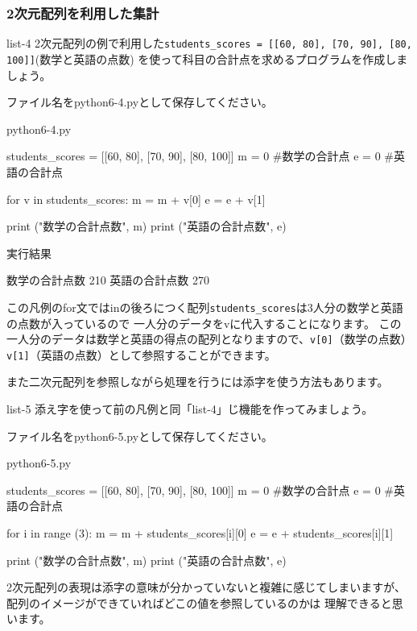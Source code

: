 \documentclass[11pt,a4paper,dvipdfmx,titlepage]{jsreport}
\begin{document}
\subsubsection{2次元配列を利用した集計}
\begin{pabox}{list-4}
2次元配列の例で利用した{\tt students\_scores = [[60, 80], [70, 90], [80, 100]]}(数学と英語の点数)
を使って科目の合計点を求めるプログラムを作成しましょう。

ファイル名をpython6-4.pyとして保存してください。
\begin{legbox}{python6-4.py}
\begin{listing}{1}
students_scores = [[60, 80], [70, 90], [80, 100]]
m = 0 #数学の合計点
e = 0 #英語の合計点

for v in students_scores:
    m = m + v[0]
    e = e + v[1]

print ("数学の合計点数", m)
print ("英語の合計点数", e)
\end{listing}
実行結果
\begin{listing}{1}
数学の合計点数 210
英語の合計点数 270
\end{listing}
\end{legbox}
この凡例のfor文ではinの後ろにつく配列{\tt students\_scores}は3人分の数学と英語の点数が入っているので
一人分のデータをvに代入することになります。
この一人分のデータは数学と英語の得点の配列となりますので、{\tt v[0]}（数学の点数）{\tt v[1]}（英語の点数）として参照することができます。
\end{pabox}
また二次元配列を参照しながら処理を行うには添字を使う方法もあります。
\begin{pabox}{list-5}
添え字を使って前の凡例と同「list-4」じ機能を作ってみましょう。

ファイル名をpython6-5.pyとして保存してください。
\begin{legbox}{python6-5.py}
\begin{listing}{1}
students_scores = [[60, 80], [70, 90], [80, 100]]
m = 0 #数学の合計点
e = 0 #英語の合計点

for i in range (3):
    m = m + students_scores[i][0]
    e = e + students_scores[i][1]

print ("数学の合計点数", m)
print ("英語の合計点数", e)
\end{listing}
\end{legbox}
2次元配列の表現は添字の意味が分かっていないと複雑に感じてしまいますが、配列のイメージができていればどこの値を参照しているのかは
理解できると思います。
\end{pabox}
\end{document}
